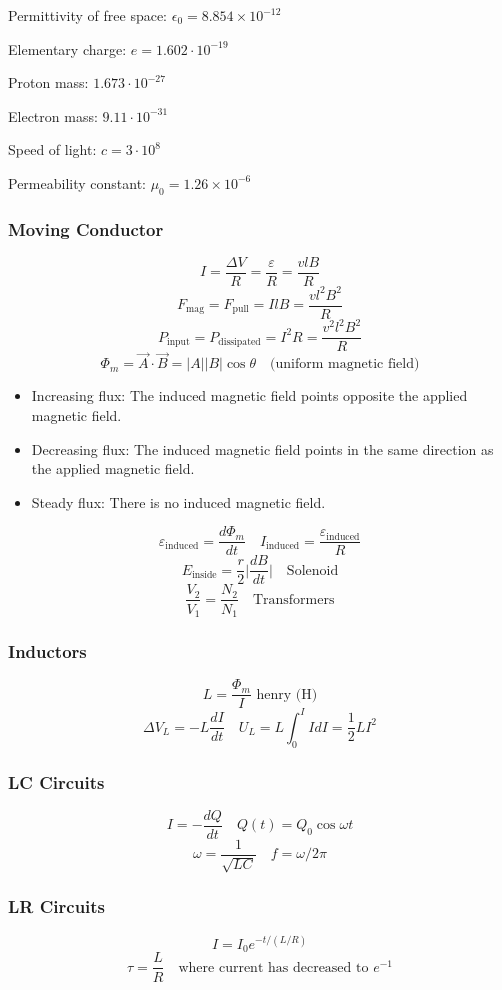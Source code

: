 \documentclass[8pt,twocolumn]{extarticle}
\begin{document}
Permittivity of free space: $\epsilon_0 = 8.854\times 10^{-12}$

Elementary charge: $e = 1.602\cdot 10^{-19}$

Proton mass: $1.673\cdot 10^{-27}$

Electron mass: $9.11\cdot 10^{-31}$

Speed of light: $c=3\cdot 10^8$

Permeability constant: $\mu_0 = 1.26\times 10^{-6}$
\subsubsection*{Moving Conductor}
\[I = \frac{\Delta V}{R} = \frac{\varepsilon}{R} = \frac{vlB}{R}\]
\[F_\text{mag}=F_\text{pull}=IlB=\frac{vl^2 B^2}{R}\]
\[P_\text{input}=P_\text{dissipated}=I^2 R=\frac{v^2 l^2 B^2}{R}\]
\[\Phi_m = \vec{A}\cdot\vec{B}=|A||B|\cos\theta\quad\text{(uniform magnetic field)}\]

\begin{itemize}
    \item Increasing flux: The induced magnetic field points opposite the applied magnetic
    field.
    \item Decreasing flux: The induced magnetic field points in the same direction as the
    applied magnetic field.
    \item Steady flux: There is no induced magnetic field.
\end{itemize}
\[\varepsilon_\text{induced} = \frac{d\Phi_m}{dt}\quad I_\text{induced}=\frac{\varepsilon_\text{induced}}{R}\]
\[E_\text{inside}=\frac{r}{2}\Big|\frac{dB}{dt}\Big|\quad\text{Solenoid}\]
\[\frac{V_2}{V_1} = \frac{N_2}{N_1}\quad\text{Transformers}\]
\subsubsection*{Inductors}
\[L=\frac{\Phi_m}{I}\text{ henry (H)}\]
\[\Delta V_L = -L\frac{dI}{dt}\quad U_L = L\int_{0}^{I}IdI = \frac{1}{2}LI^2\]
\subsubsection*{LC Circuits}
\[I=-\frac{dQ}{dt}\quad Q(t)=Q_0\cos\omega t\]
\[\omega = \frac{1}{\sqrt{LC}}\quad f =\omega / 2\pi \]
\subsubsection*{LR Circuits}
\[I=I_0 e^{-t/(L / R)}\]
\[\tau = \frac{L}{R}\quad\text{where current has decreased to }e^{-1}\]
\end{document}
